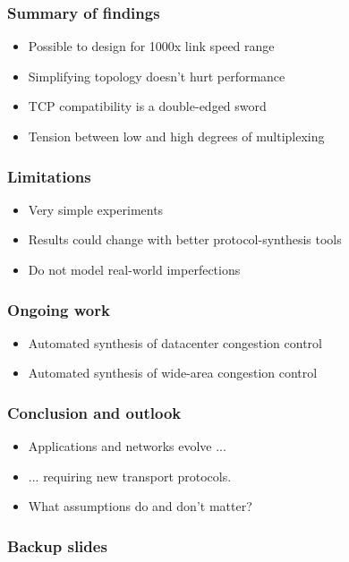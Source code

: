 \documentclass[svgnames]{beamer}
\begin{document}
\begin{Large}
\begin{frame}
\frametitle{Summary of findings}
\begin{itemize}
\item<2-> Possible to design for 1000x link speed range
\item<3-> Simplifying topology doesn't hurt performance
\item<4-> TCP compatibility is a double-edged sword 
\item<5-> Tension between low and high degrees of multiplexing
\end{itemize}
\end{frame}

\begin{frame}
\frametitle{Limitations}
\begin{itemize}
\item<2-> Very simple experiments
\item<3-> Results could change with better protocol-synthesis tools
\item<4-> Do not model real-world imperfections
\end{itemize}
\end{frame}
\begin{frame}

\frametitle{Ongoing work}
\begin{itemize}
\item<2-> Automated synthesis of datacenter congestion control
\item<3-> Automated synthesis of wide-area congestion control
\end{itemize}
\end{frame}

\begin{frame}
\frametitle{Conclusion and outlook}
\begin{itemize}
\item<2-> Applications and networks evolve ...
\item<3-> ... requiring new transport protocols.
\item<4-> What assumptions do and don't matter?
\end{itemize}
\end{frame}

\end{Large}

\begin{frame}
\frametitle{Backup slides}
\end{frame}







\end{document}
